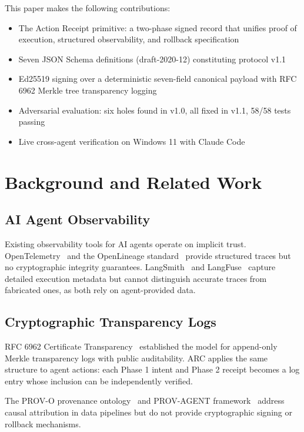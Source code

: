 \documentclass[10pt,twocolumn]{article}
\begin{document}
This paper makes the following contributions:
\begin{itemize}[noitemsep,topsep=2pt]
  \item The Action Receipt primitive: a two-phase signed record that unifies
    proof of execution, structured observability, and rollback specification
  \item Seven JSON Schema definitions (draft-2020-12) constituting protocol v1.1
  \item Ed25519 signing over a deterministic seven-field canonical payload with
    RFC 6962 Merkle tree transparency logging
  \item Adversarial evaluation: six holes found in v1.0, all fixed in v1.1,
    58/58 tests passing
  \item Live cross-agent verification on Windows 11 with Claude Code
\end{itemize}

\section{Background and Related Work}

\subsection{AI Agent Observability}

Existing observability tools for AI agents operate on implicit trust.
OpenTelemetry~\cite{otel2024} and the OpenLineage standard~\cite{openlineage2024}
provide structured traces but no cryptographic integrity guarantees.
LangSmith~\cite{langsmith2024} and LangFuse~\cite{langfuse2024} capture
detailed execution metadata but cannot distinguish accurate traces from
fabricated ones, as both rely on agent-provided data.

\subsection{Cryptographic Transparency Logs}

RFC 6962 Certificate Transparency~\cite{rfc6962} established the model for
append-only Merkle transparency logs with public auditability. ARC applies
the same structure to agent actions: each Phase 1 intent and Phase 2 receipt
becomes a log entry whose inclusion can be independently verified.

The PROV-O provenance ontology~\cite{provo2013} and PROV-AGENT
framework~\cite{provagent2024} address causal attribution in data pipelines
but do not provide cryptographic signing or rollback mechanisms.
\end{document}
